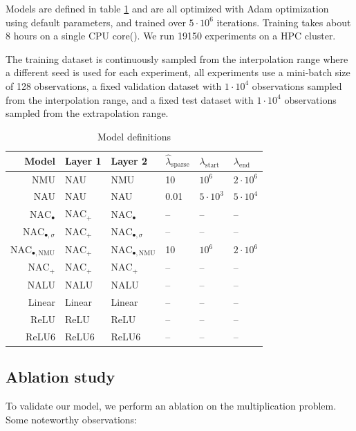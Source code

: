 Models are defined in table \ref{tab:simple-function-task-model-defintions} and are all optimized with Adam optimization \cite{adam-optimization} using default parameters, and trained over $5 \cdot 10^6$ iterations. Training takes about 8 hours on a single CPU core(). We run 19150 experiments on a HPC cluster.

The training dataset is continuously sampled from the interpolation range where a different seed is used for each experiment, all experiments use a mini-batch size of 128 observations, a fixed validation dataset with $1 \cdot 10^4$ observations sampled from the interpolation range, and a fixed test dataset with $1 \cdot 10^4$ observations sampled from the extrapolation range.

\begin{table}[h]
\caption{Model definitions}
\label{tab:simple-function-task-model-defintions}
\centering
\begin{tabular}{r l l l l l}
\toprule
 Model & Layer 1 & Layer 2 & $\hat{\lambda}_{\mathrm{sparse}}$ & $\lambda_{\mathrm{start}}$ & $\lambda_{\mathrm{end}}$ \\
 \midrule
 NMU & NAU & NMU & 10 & $10^6$ & $2 \cdot 10^6$ \\
 NAU & NAU & NAU & 0.01 & $5 \cdot 10^3$ & $5 \cdot 10^4$ \\
 $\mathrm{NAC}_{\bullet}$ & $\mathrm{NAC}_{+}$ & $\mathrm{NAC}_{\bullet}$ & -- & -- & -- \\
 $\mathrm{NAC}_{\bullet,\sigma}$ & $\mathrm{NAC}_{+}$ & $\mathrm{NAC}_{\bullet,\sigma}$ & -- & -- & -- \\
 $\mathrm{NAC}_{\bullet,\mathrm{NMU}}$ & $\mathrm{NAC}_{+}$ & $\mathrm{NAC}_{\bullet,\mathrm{NMU}}$ & 10 & $10^6$ & $2 \cdot 10^6$ \\
 $\mathrm{NAC}_{+}$ & $\mathrm{NAC}_{+}$ & $\mathrm{NAC}_{+}$ & -- & -- & -- \\
 NALU & NALU & NALU & -- & -- & -- \\
 Linear & Linear & Linear & -- & -- & -- \\
 ReLU & ReLU & ReLU & -- & -- & -- \\
 ReLU6 & ReLU6 & ReLU6 & -- & -- & -- \\
 \bottomrule
\end{tabular}
\end{table}

\subsection{Ablation study}
\label{sec:appendix:ablation-study}
To validate our model, we perform an ablation on the multiplication problem. Some noteworthy observations:

